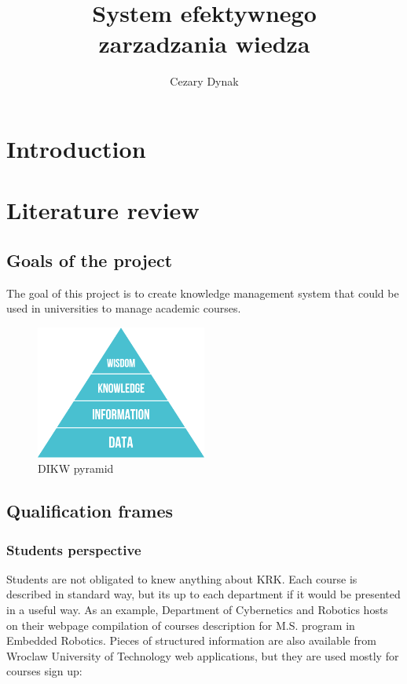\documentclass[printmode]{mgr}
\title{System efektywnego \\ zarzadzania wiedza}
\author{Cezary Dynak}
\begin{document}


\maketitle

\tableofcontents

\chapter{Introduction}

\chapter{Literature review}
\label{chapter:literature-review}
\section{Goals of the project}
The goal of this project is to create knowledge management system that could
be used in universities to manage academic courses. \cite{web:esco-api}

\begin{figure}[htbp]
  \centering
    \includegraphics[width=0.5\textwidth]{dikw-pyramid.png}
  \caption{DIKW pyramid}
  \label{fig:panel-dotykowy}
\end{figure}

\section{Qualification frames}

\subsection{Students perspective}
Students are not obligated to knew anything about KRK. Each course is described
in standard way, but its up to each department if it would be presented in a
useful way. As an example, Department of Cybernetics and Robotics hosts on
their webpage compilation of courses description for M.S. program in Embedded
Robotics\cite{web:aer-krk}. Pieces of structured information are also available
from Wroclaw University of Technology web applications, but they are used
mostly for courses sign up:
\end{document}
